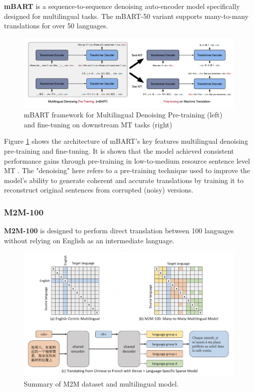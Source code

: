 \documentclass[a4paper]{article}
\begin{document}
\textbf{mBART} \cite{liu-2020-mbart} is a sequence-to-sequence denoising auto-encoder model specifically designed for multilingual tasks. The mBART-50 variant supports many-to-many translations for over 50 languages.

\begin{figure}[htbp]
    \centering
    \includegraphics[width=0.9\linewidth]{images/mbart.png}
    \caption{mBART framework for Multilingual Denoising Pre-training (left) and fine-tuning on downstream MT tasks
        (right) \cite{liu-2020-mbart}}
    \label{fig:mbart}
\end{figure}

Figure \ref{fig:mbart} shows the architecture of mBART's key features multilingual denoising pre-training and fine-tuning. It is shown that the model achieved consistent performance gains through pre-training in low-to-medium resource sentence level MT \cite{liu-2020-mbart}. The "denoising" here refers to a pre-training technique used to improve the model's ability to generate coherent and accurate translations by training it to reconstruct original sentences from corrupted (noisy) versions.

\subsubsection{M2M-100}

\textbf{M2M-100} \cite{fan-2020-m2m100} is designed to perform direct translation between 100 languages without relying on English as an intermediate language.


\begin{figure}[htbp]
    \centering
    \includegraphics[width=0.9\linewidth]{images/m2m.png}
    \caption{Summary of M2M dataset and multilingual model.}
    \label{fig:m2m}
\end{figure}
\end{document}
